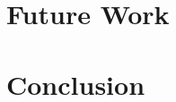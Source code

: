 \documentclass[11pt]{article}
\theoremstyle{definition}
\begin{document}
\section{Future Work}

\section{Conclusion}



\end{document}
